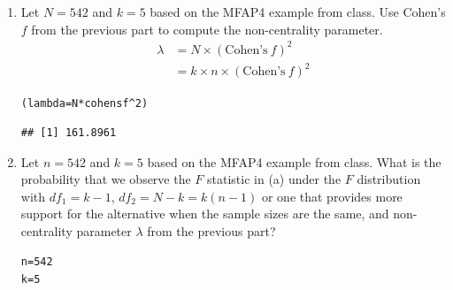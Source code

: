 \documentclass{article}\usepackage[]{graphicx}\usepackage[]{xcolor}
\makeatletter
\newcommand{\hlnum}[1]{\textcolor[rgb]{0.686,0.059,0.569}{#1}}%
\newcommand{\hlopt}[1]{\textcolor[rgb]{0,0,0}{#1}}%
\newcommand{\hldef}[1]{\textcolor[rgb]{0.345,0.345,0.345}{#1}}%
\newcommand{\hlkwb}[1]{\textcolor[rgb]{0.69,0.353,0.396}{#1}}%
\newcommand{\hlkwd}[1]{\textcolor[rgb]{0.737,0.353,0.396}{\textbf{#1}}}%
\newenvironment{kframe}{%
 \def\at@end@of@kframe{}%
 \ifinner\ifhmode%
  \def\at@end@of@kframe{\end{minipage}}%
  \begin{minipage}{\columnwidth}%
 \fi\fi%
 \def\FrameCommand##1{\hskip\@totalleftmargin \hskip-\fboxsep
 \colorbox{shadecolor}{##1}\hskip-\fboxsep
     \hskip-\linewidth \hskip-\@totalleftmargin \hskip\columnwidth}%
 \MakeFramed {\advance\hsize-\width
   \@totalleftmargin\z@ \linewidth\hsize
   \@setminipage}}%
 {\par\unskip\endMakeFramed%
 \at@end@of@kframe}
\newenvironment{knitrout}{}{} %
\makeatother
\begin{document}
\begin{enumerate}
\begin{enumerate}
\begin{knitrout}\scriptsize
{}\color{fgcolor}\begin{kframe}
\begin{alltt}
\hldef{omega2} \hlkwb{<-} \hlnum{0.23}

\hldef{(cohensf} \hlkwb{<-} \hlkwd{sqrt}\hldef{(omega2}\hlopt{/}\hldef{(}\hlnum{1}\hlopt{-}\hldef{omega2)))}
\end{alltt}
\begin{verbatim}
## [1] 0.5465357
\end{verbatim}
\end{kframe}
\end{knitrout}
\item Let $N=542$ and $k=5$ based on the MFAP4 example from class. Use 
Cohen's $f$ from the previous part to compute the non-centrality parameter.
\begin{align*}
\lambda &=N \times (\textrm{Cohen's}~f)^2 \\
&=k \times n \times (\textrm{Cohen's}~f)^2 \tag{Equal sample size $n$}
\end{align*}

\begin{knitrout}\scriptsize
{}\color{fgcolor}\begin{kframe}
\begin{alltt}
\hldef{(lambda} \hlkwb{=} \hldef{N} \hlopt{*} \hldef{cohensf}\hlopt{^}\hlnum{2}\hldef{)}
\end{alltt}
\begin{verbatim}
## [1] 161.8961
\end{verbatim}
\end{kframe}
\end{knitrout}
\item Let $n=542$ and $k=5$ based on the MFAP4 example from class. What is 
the probability that we observe the $F$ statistic in (a) under the $F$ 
distribution with $df_1=k-1$, $df_2=N-k=k(n-1)$ or one that provides more
support for the alternative when the sample sizes are the same, and 
non-centrality parameter $\lambda$ from the previous part?

\begin{knitrout}\scriptsize
{}\color{fgcolor}\begin{kframe}
\begin{alltt}
\hldef{n} \hlkwb{=} \hlnum{542}
\hldef{k} \hlkwb{=} \hlnum{5}


\end{alltt}
\end{kframe}
\end{knitrout}
\end{enumerate}
\end{enumerate}
\end{document}
